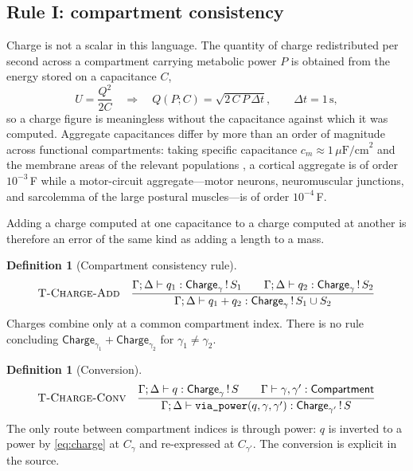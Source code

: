 \documentclass[11pt,twocolumn,a4paper]{article}
\theoremstyle{thmstyle}
\theoremstyle{definition}
\newtheorem{definition}[theorem]{Definition}
\theoremstyle{remark}
\newcommand{\Env}{\Gamma}
\newcommand{\Comp}{\textsf{Compartment}}
\newcommand{\Chg}{\textsf{Charge}}
\begin{document}
\subsection{Rule I: compartment consistency}
\label{sec:compartments}

Charge is not a scalar in this language. The quantity of charge redistributed
per second across a compartment carrying metabolic power $P$ is obtained from
the energy stored on a capacitance $C$,
\begin{equation}
U=\frac{Q^{2}}{2C}
\quad\Longrightarrow\quad
Q(P;C)=\sqrt{2\,C\,P\,\Delta t},\qquad \Delta t=1\,\mathrm{s},
\label{eq:charge}
\end{equation}
so a charge figure is meaningless without the capacitance against which it was
computed. Aggregate capacitances differ by more than an order of magnitude
across functional compartments: taking specific capacitance
$c_m\approx1\,\mu\mathrm{F/cm}^2$ \citep{cole1941,gentet2000} and the membrane
areas of the relevant populations \citep{kandel2013,purves2018}, a cortical
aggregate is of order $10^{-3}$\,F while a motor-circuit aggregate---motor
neurons, neuromuscular junctions, and sarcolemma of the large postural
muscles---is of order $10^{-4}$\,F.

Adding a charge computed at one capacitance to a charge computed at another is
therefore an error of the same kind as adding a length to a mass.

\begin{definition}[Compartment consistency rule]
\label{def:comp-rule}
\[
\textsc{T-Charge-Add}\quad
\frac{\Env;\Delta\vdash q_1:\Chg_{\gamma}\,!\,S_1\qquad
      \Env;\Delta\vdash q_2:\Chg_{\gamma}\,!\,S_2}
     {\Env;\Delta\vdash q_1+q_2:\Chg_{\gamma}\,!\,S_1\cup S_2}
\]
Charges combine only at a common compartment index. There is no rule
concluding $\Chg_{\gamma_1}+\Chg_{\gamma_2}$ for $\gamma_1\ne\gamma_2$.
\end{definition}

\begin{definition}[Conversion]
\label{def:conversion}
\[
\textsc{T-Charge-Conv}\quad
\frac{\Env;\Delta\vdash q:\Chg_{\gamma}\,!\,S\qquad
      \Env\vdash \gamma,\gamma':\Comp}
     {\Env;\Delta\vdash \texttt{via\_power}(q,\gamma,\gamma'):\Chg_{\gamma'}\,!\,S}
\]
The only route between compartment indices is through power: $q$ is inverted
to a power by \eqref{eq:charge} at $C_{\gamma}$ and re-expressed at
$C_{\gamma'}$. The conversion is explicit in the source.
\end{definition}
\end{document}
